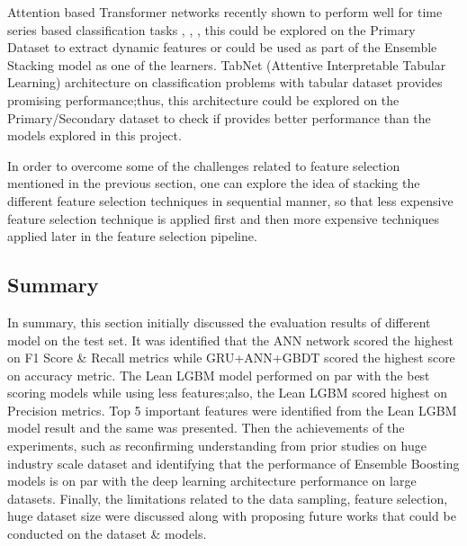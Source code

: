 \documentclass[twoside,11pt,a4paper]{article}
\begin{document}
Attention based Transformer networks recently shown to perform well for time series based classification tasks \citep{wen2022transformers}, \citep{lim2021temporal}, \citep{cholakov2021transformers}, this could be explored on the Primary Dataset to extract dynamic features or could be used as part of the Ensemble Stacking model as one of the learners. TabNet (Attentive Interpretable Tabular Learning)\citep{arik2021tabnet} architecture on classification problems with tabular dataset provides promising performance;thus, this architecture could be explored on the Primary/Secondary dataset to check if provides better performance than the models explored in this project.

In order to overcome some of the challenges related to feature selection mentioned in the previous section, one can explore the idea of stacking the different feature selection techniques in sequential manner, so that less expensive feature selection technique is applied first and then more expensive techniques applied later in the feature selection pipeline.
\subsection{Summary}
In summary, this section initially discussed the evaluation results of different model on the test set. It was identified that the \acs{ANN} network scored the highest on F1 Score \& Recall metrics while \acs{GRU}+\acs{ANN}+\acs{GBDT} scored the highest score on accuracy metric. The Lean \acs{LGBM} model performed on par with the best scoring models while using less features;also, the Lean \acs{LGBM} scored highest on Precision metrics. Top 5 important features were identified from the Lean \acs{LGBM} model result and the same was presented.
Then the achievements of the experiments, such as reconfirming understanding from prior studies on huge industry scale dataset and identifying that the performance of Ensemble Boosting models is on par with the deep learning architecture performance on large datasets.
Finally, the limitations related to the data sampling, feature selection, huge dataset size were discussed along with proposing future works that could be conducted on the dataset \& models.
\end{document}
